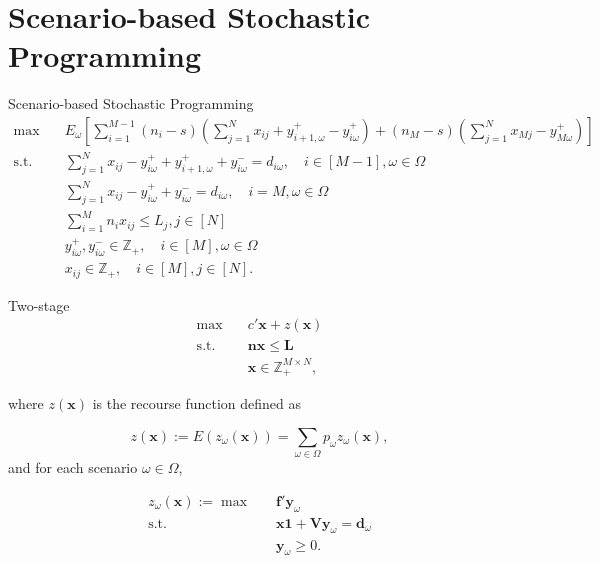 
\section{Scenario-based Stochastic Programming}
    \frame{\sectionpage}

    \begin{frame}{Scenario-based Stochastic Programming}
      \small
      \begin{equation}\label{sto_form}
        \begin{aligned}
        \max \quad & E_{\omega}\left[\sum_{i=1}^{M-1} (n_i-s) (\sum_{j= 1}^{N} x_{ij} + y_{i+1,\omega}^{+} - y_{i \omega}^{+}) + (n_{M}-s) (\sum_{j= 1}^{N} x_{Mj} - y_{M \omega}^{+})\right] \\
        \text {s.t.} \quad & \sum_{j= 1}^{N} x_{ij}-y_{i \omega}^{+}+
        y_{i+1, \omega}^{+} + y_{i \omega}^{-}=d_{i \omega}, \quad i \in [M-1], \omega \in \Omega \\
        & \sum_{j= 1}^{N} x_{ij} -y_{i \omega}^{+}+y_{i \omega}^{-}=d_{i \omega}, \quad i = M, \omega \in \Omega \\
        & \sum_{i=1}^{M} n_{i} x_{ij} \leq L_j, j \in [N]\\
        & y_{i \omega}^{+}, y_{i \omega}^{-} \in \mathbb{Z}_{+}, \quad i \in [M], \omega \in \Omega \\
        & x_{ij} \in \mathbb{Z}_{+}, \quad i \in [M], j \in [N].
        \end{aligned}
      \end{equation}
    \end{frame}

\begin{frame}{Two-stage}
  \begin{equation}\label{BD_master}
    \begin{aligned}
  \max \quad & c{'} \mathbf{x}+ z(\mathbf{x}) \\
  \text {s.t.} \quad & \mathbf{n} \mathbf{x} \leq \mathbf{L} \\
  & \mathbf{x} \in \mathbb{Z}_{+}^{M \times N},
  \end{aligned}
  \end{equation}

  where $z(\mathbf{x})$ is the recourse function defined as 

$$z(\mathbf{x}) := E(z_{\omega}(\mathbf{x})) = \sum_{\omega \in \Omega} p_{\omega} z_{\omega}(\mathbf{x}),$$ and for each scenario $\omega \in \Omega$, 

  \begin{equation}\label{BD_sub}
    \begin{aligned}
      z_{\omega}(\mathbf{x}) := \max \quad & \mathbf{f}{'} \mathbf{y}_{\omega} \\
      \text {s.t.} \quad & \mathbf{x} \mathbf{1} + \mathbf{V} \mathbf{y}_{\omega} = \mathbf{d}_{\omega} \\
       & \mathbf{y}_{\omega} \geq 0.
    \end{aligned}
    \end{equation}
\end{frame}

